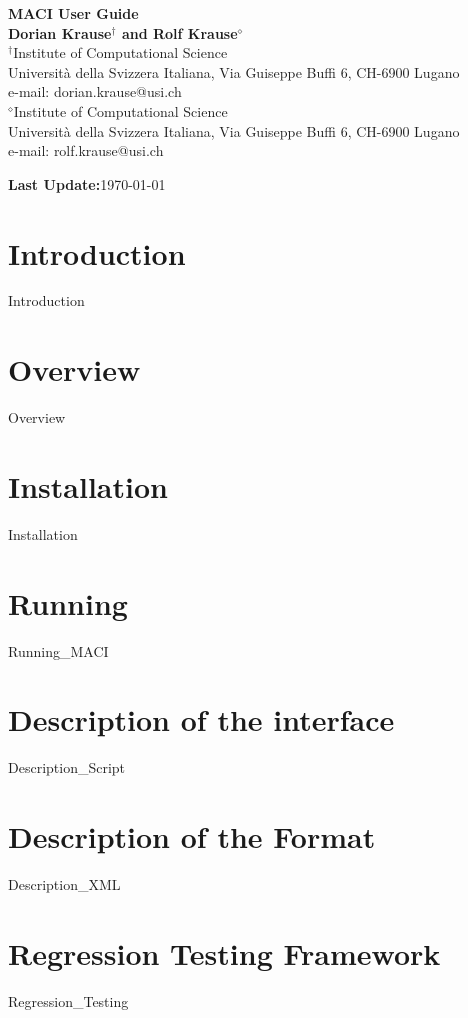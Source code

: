 \documentclass[12pt,fleqn]{article}
\begin{document}
\begin{center}
{\Large\bf MACI User Guide}
\vspace{0.1cm}\\
{\bf Dorian Krause$^{\dagger}$ and 
	 Rolf Krause$^{\diamond}$}
\vspace{0.1cm}\\
{$^{\dagger}$Institute of Computational Science\\
Universit\`{a} della Svizzera Italiana, Via Guiseppe Buffi 6, CH-6900 Lugano\\
e-mail: dorian.krause@usi.ch}\linebreak\\
{$^{\diamond}$Institute of Computational Science\\
Universit\`{a} della Svizzera Italiana, Via Guiseppe Buffi 6, CH-6900 Lugano\\
e-mail: rolf.krause@usi.ch}
\end  {center}

\noindent\textbf{Last Update:}\quad\today

\section{Introduction}
  {Introduction}

\section{Overview}
  {Overview}

\section{Installation}
  {Installation}

\section{Running \MACI}
  {Running_MACI}

\section{Description of the \PYTHON interface}
  {Description_Script}

\section{Description of the \XML Format}
  {Description_XML}

\section{Regression Testing Framework \label{sect:Regression_Testing}}
  {Regression_Testing}



\end{document}
